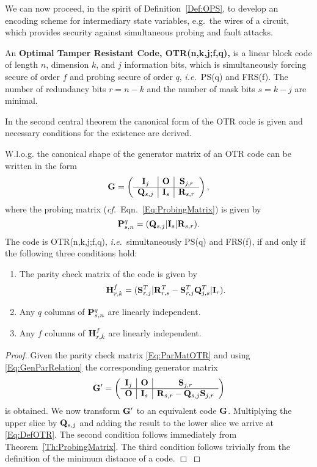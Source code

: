 \documentclass[11pt]{llncs}
\newcommand{\BE}{\begin{equation}}      \newcommand{\EE}{\end{equation}}
\newcommand{\BDEF}{\begin{definition}}  \newcommand{\EDEF}{\end{definition}}
\newcommand{\eg}{{e.g.\ }}
\newcommand{\ie}{{\it i.e.\ }}
\newcommand{\cf}{{\it cf.\ }}
\newcommand{\QED}{\hfill $\Box$}
\begin{document}
We can now proceed, in the spirit of Definition~\ref{Def:OPS},
to develop an encoding scheme for intermediary state variables,
\eg the wires of a circuit,
which provides security against simultaneous probing and fault attacks.
\BDEF
An \textbf{Optimal Tamper Resistant Code, OTR(n,k,j;f,q),}
is a linear block code of length $n$,
dimension $k$, and $j$ information bits,
which is simultaneously forcing secure of order $f$
and probing secure of order $q$, \ie PS(q) and FRS(f).
The number of redundancy bits $r = n-k$ and
the number of mask bits $s = k-j$ are minimal.
\EDEF
In the second central theorem the canonical form of the OTR code is given
and necessary conditions for the existence are derived.
\begin{theorem}
W.l.o.g. the canonical shape of the generator matrix of an OTR code
can be written in the form
\BE
 \V G =
  \left(\begin{array}{c|c|c}
    \V I_{j}    &  \V O      & \V S_{j,r}  \\
    \hline
    \V Q_{s,j}  &  \V I_{s}  & \V R_{s,r}
  \end{array}\right),
\label{Eq:DefOTR}
\EE
where the probing matrix (\cf Eqn.\ \ref{Eq:ProbingMatrix}) is given by
\BE
   \V P^q_{s,n} = (\V Q_{s,j} | \V I_s | \V R_{s,r}).
\label{Eq:ProbMatOTR}
\EE
The code is OTR(n,k,j;f,q), \ie simultaneously PS(q) and FRS(f),
if and only if the following three conditions hold:
\begin{enumerate}
\item The parity check matrix of the code is given by
      \BE
         \V H^f_{r,k} = (\V S^T_{r,j} | \V R^T_{r,s} - \V S^T_{r,j} \V Q^T_{j,s}  | \V I_r).
         \label{Eq:ParMatOTR}
       \EE
\item Any $q$ columns of $\mathbf{P}^q_{s,n}$ are linearly independent.
\item Any $f$ columns of $\mathbf{H}^f_{r,k}$ are linearly independent.
\end{enumerate}
\end{theorem}
\begin{proof}
Given the parity check matrix \eqref{Eq:ParMatOTR}
and using \eqref{Eq:GenParRelation}
the corresponding generator matrix
\[
    \mathbf{G}' = \left(\begin{array}{c|c|c}
                    \mathbf{I}_{j}   &  \mathbf{O}      & \mathbf{S}_{j,r}  \\
                    \hline
                    \mathbf{O}    &  \mathbf{I}_{s}  & \mathbf{R}_{s,r}-\mathbf{Q}_{s,j} \mathbf{S}_{j,r}
                    \end{array}\right)
\]
is obtained. We now transform $\mathbf{G}'$ to an equivalent code $\mathbf{G}$.
Multiplying the upper slice by $\mathbf{Q}_{s,j}$ and adding the
result to the lower slice we arrive at \eqref{Eq:DefOTR}.
The second condition follows immediately from Theorem~\ref{Th:ProbingMatrix}.
The third condition follows trivially from the definition
of the minimum distance of a code.
\QED
\end{proof}
\end{document}
